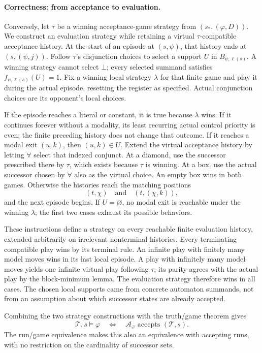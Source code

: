 \paragraph{Correctness: from acceptance to evaluation.}
Conversely, let \(\tau\) be a winning
acceptance-game strategy from
\((s_*,(\varphi,D))\).
We construct an evaluation strategy
while retaining a virtual
\(\tau\)-compatible acceptance history.
At the start of an episode at
\((s,\psi)\), that history ends at
\((s,(\psi,j))\).
Follow \(\tau\)'s disjunction choices
to select a support \(U\) in
\(B_{\psi,\ell(s)}\).
A winning strategy cannot select
\(\bot\); every selected summand
satisfies \(f_{\psi,\ell(s)}(U)=1\).
Fix a winning local strategy
\(\lambda\) for that finite game
and play it during the actual episode,
resetting the register as specified.
Actual conjunction choices are its
opponent's local choices.

If the episode reaches a literal or
constant, it is true because
\(\lambda\) wins.
If it continues forever without
a modality, its least recurring
actual control priority is even;
the finite preceding history does
not change that outcome.
If it reaches a modal exit \((u,k)\),
then \((u,k)\in U\).
Extend the virtual acceptance history
by letting \(\forall\) select that
indexed conjunct.
At a diamond, use the successor
prescribed there by \(\tau\), which
exists because \(\tau\) is winning.
At a box, use the actual successor
chosen by \(\forall\) also as the
virtual choice. An empty box wins
in both games. Otherwise the histories
reach the matching positions
\[
 (t,\chi)\quad\text{and}\quad(t,(\chi,k)),
\]
and the next episode begins.
If \(U=\varnothing\), no modal exit
is reachable under the winning
\(\lambda\); the first two cases
exhaust its possible behaviors.

These instructions define a strategy
on every reachable finite evaluation
history, extended arbitrarily on
irrelevant nonterminal histories.
Every terminating compatible play
wins by its terminal rule.
An infinite play with finitely many
model moves wins in its last local
episode. A play with infinitely many
model moves yields one infinite
virtual play following \(\tau\);
its parity agrees with the actual
play by the block-minimum lemma.
The evaluation strategy therefore
wins in all cases.
The chosen local supports came from
concrete automaton summands, not from
an assumption about which successor
states are already accepted.

Combining the two strategy constructions
with the truth/game theorem gives
\[
 \mathcal T,s\models\varphi
 \quad\Longleftrightarrow\quad
 \mathcal A_\varphi\text{ accepts }(\mathcal T,s).
\]
The run/game equivalence makes this
also an equivalence with accepting
runs, with no restriction on the
cardinality of successor sets.


